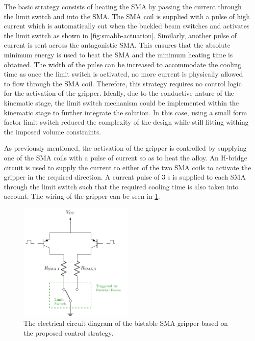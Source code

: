 The basic strategy consists of heating the SMA by passing the current through the limit switch and into the SMA. The SMA coil is supplied with a pulse of high current which is automatically cut when the buckled beam switches and activates the limit switch as shown in \cref{fig:smabb-actuation}. Similarly, another pulse of current is sent across the antagonistic SMA. This ensures that the absolute minimum energy is used to heat the SMA and the minimum heating time is obtained. The width of the pulse can be increased to accommodate the cooling time as once the limit switch is activated, no more current is physically allowed to flow through the SMA coil. Therefore, this strategy requires no control logic for the activation of the gripper. Ideally, due to the conductive nature of the kinematic stage, the limit switch mechanism could be implemented within the kinematic stage to further integrate the solution. In this case, using a small form factor limit switch reduced the complexity of the design while still fitting withing the imposed volume constraints.

As previously mentioned, the activation of the gripper is controlled by supplying one of the SMA coils with a pulse of current so as to heat the alloy. An H-bridge circuit is used to supply the current to either of the two SMA coils to activate the gripper in the required direction. A current pulse of $3$ s is supplied to each SMA through the limit switch such that the required cooling time is also taken into account. The wiring of the gripper can be seen in \cref{fig:smabb-circuit}.

\begin{figure}[hbt!] %
  \centering
  \includegraphics[width=0.5\textwidth]{images/chap6/smabb-circuit-diagram.pdf}
  \caption{The electrical circuit diagram of the bistable SMA gripper based on the proposed control strategy.}
  \label{fig:smabb-circuit}
\end{figure}

